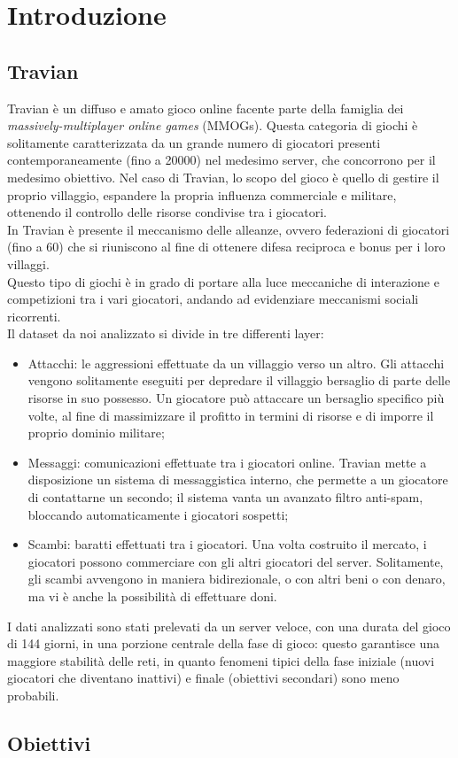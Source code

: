 \chapter{Introduzione}
\section{Travian}
Travian è un diffuso e amato gioco online facente parte della famiglia dei \textit{massively-multiplayer online games} (MMOGs).
Questa categoria di giochi è solitamente caratterizzata da un grande numero di giocatori presenti contemporaneamente (fino a 20000) nel medesimo server, che concorrono per il medesimo obiettivo.
Nel caso di Travian, lo scopo del gioco è quello di gestire il proprio villaggio, espandere la propria influenza commerciale e militare, ottenendo il controllo delle risorse condivise tra i giocatori.\\
In Travian è presente il meccanismo delle alleanze, ovvero federazioni di giocatori (fino a 60) che si riuniscono al fine di ottenere difesa reciproca e bonus per i loro villaggi.\\
Questo tipo di giochi è in grado di portare alla luce meccaniche di interazione e competizioni tra i vari giocatori, andando ad evidenziare meccanismi sociali ricorrenti.\\
Il dataset da noi analizzato si divide in tre differenti layer:

\begin{itemize}
	\item Attacchi: le aggressioni effettuate da un villaggio verso un altro. Gli attacchi vengono solitamente eseguiti per depredare il villaggio bersaglio di parte delle risorse in suo possesso. Un giocatore può attaccare un bersaglio specifico più volte, al fine di massimizzare il profitto in termini di risorse e di imporre il proprio dominio militare;
	\item Messaggi: comunicazioni effettuate tra i giocatori online. Travian mette a disposizione un sistema di messaggistica interno, che permette a un giocatore di contattarne un secondo; il sistema vanta un avanzato filtro anti-spam, bloccando automaticamente i giocatori sospetti;
	\item Scambi: baratti effettuati tra i giocatori. Una volta costruito il mercato, i giocatori possono commerciare con gli altri giocatori del server. Solitamente, gli scambi avvengono in maniera bidirezionale, o con altri beni o con denaro, ma vi è anche la possibilità di effettuare doni.
\end{itemize}
I dati analizzati sono stati prelevati da un server veloce, con una durata del gioco di 144 giorni, in una porzione centrale della fase di gioco: questo garantisce una maggiore stabilità delle reti, in quanto fenomeni tipici della fase iniziale (nuovi giocatori che diventano inattivi) e finale (obiettivi secondari) sono meno probabili.

\section{Obiettivi}
